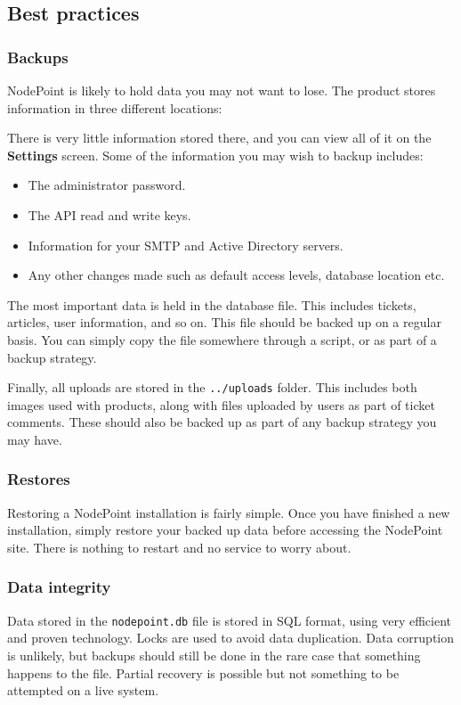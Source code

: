 \documentclass[11pt]{article}
\begin{document}
\subsection{Best practices}
\subsubsection{Backups}
NodePoint is likely to hold data you may not want to lose. The product stores information in three different locations:

 There is very little information stored there, and you can view all of it on the \textbf{Settings} screen. Some of the information you may wish to backup includes:

\begin{itemize}
\item The administrator password.
\item The API read and write keys.
\item Information for your SMTP and Active Directory servers.
\item Any other changes made such as default access levels, database location etc.
\end{itemize}

The most important data is held in the database file. This includes tickets, articles, user information, and so on. This file should be backed up on a regular basis. You can simply copy the file somewhere through a script, or as part of a backup strategy.

Finally, all uploads are stored in the \texttt{../uploads} folder. This includes both images used with products, along with files uploaded by users as part of ticket comments. These should also be backed up as part of any backup strategy you may have.

\subsubsection{Restores}
Restoring a NodePoint installation is fairly simple. Once you have finished a new installation, simply restore your backed up data before accessing the NodePoint site. There is nothing to restart and no service to worry about.

\subsubsection{Data integrity}
Data stored in the \texttt{nodepoint.db} file is stored in SQL format, using very efficient and proven technology. Locks are used to avoid data duplication. Data corruption is unlikely, but backups should still be done in the rare case that something happens to the file. Partial recovery is possible but not something to be attempted on a live system.
\end{document}
